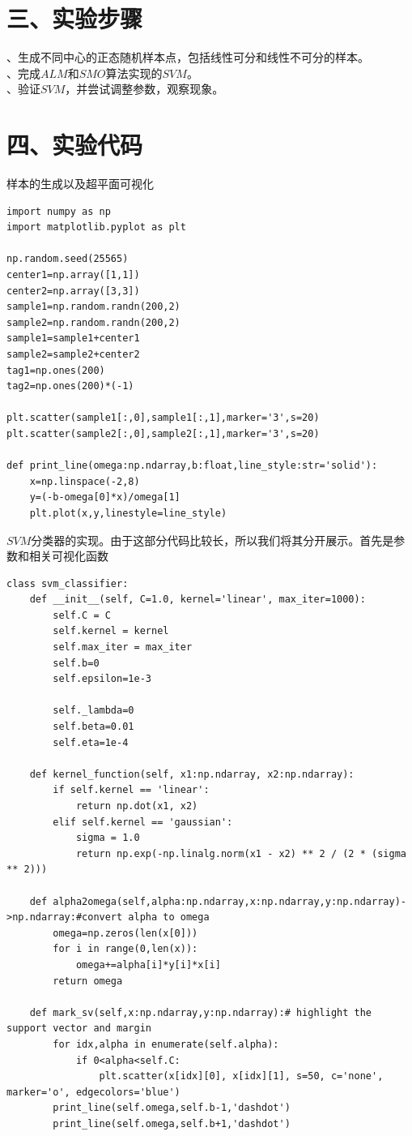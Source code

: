 \documentclass{article}
\begin{document}
\section*{\LARGE 三、实验步骤}
、生成不同中心的正态随机样本点，包括线性可分和线性不可分的样本。\\
、完成$ALM$和$SMO$算法实现的$SVM$。\\
、验证$SVM$，并尝试调整参数，观察现象。

\section*{\LARGE 四、实验代码}
\noindent 样本的生成以及超平面可视化
\begin{verbatim}
import numpy as np
import matplotlib.pyplot as plt

np.random.seed(25565)
center1=np.array([1,1])
center2=np.array([3,3])
sample1=np.random.randn(200,2)
sample2=np.random.randn(200,2)
sample1=sample1+center1
sample2=sample2+center2
tag1=np.ones(200)
tag2=np.ones(200)*(-1)

plt.scatter(sample1[:,0],sample1[:,1],marker='3',s=20)
plt.scatter(sample2[:,0],sample2[:,1],marker='3',s=20)

def print_line(omega:np.ndarray,b:float,line_style:str='solid'):
    x=np.linspace(-2,8)
    y=(-b-omega[0]*x)/omega[1]
    plt.plot(x,y,linestyle=line_style)
\end{verbatim}

\noindent $SVM$分类器的实现。由于这部分代码比较长，所以我们将其分开展示。首先是参数和相关可视化函数
\begin{verbatim}
class svm_classifier:
    def __init__(self, C=1.0, kernel='linear', max_iter=1000):
        self.C = C
        self.kernel = kernel
        self.max_iter = max_iter
        self.b=0
        self.epsilon=1e-3

        self._lambda=0
        self.beta=0.01
        self.eta=1e-4

    def kernel_function(self, x1:np.ndarray, x2:np.ndarray):
        if self.kernel == 'linear':
            return np.dot(x1, x2)
        elif self.kernel == 'gaussian':
            sigma = 1.0
            return np.exp(-np.linalg.norm(x1 - x2) ** 2 / (2 * (sigma ** 2)))

    def alpha2omega(self,alpha:np.ndarray,x:np.ndarray,y:np.ndarray)->np.ndarray:#convert alpha to omega
        omega=np.zeros(len(x[0]))
        for i in range(0,len(x)):
            omega+=alpha[i]*y[i]*x[i]
        return omega

    def mark_sv(self,x:np.ndarray,y:np.ndarray):# highlight the support vector and margin
        for idx,alpha in enumerate(self.alpha):
            if 0<alpha<self.C:
                plt.scatter(x[idx][0], x[idx][1], s=50, c='none', marker='o', edgecolors='blue')
        print_line(self.omega,self.b-1,'dashdot')
        print_line(self.omega,self.b+1,'dashdot')
\end{verbatim}
\end{document}
